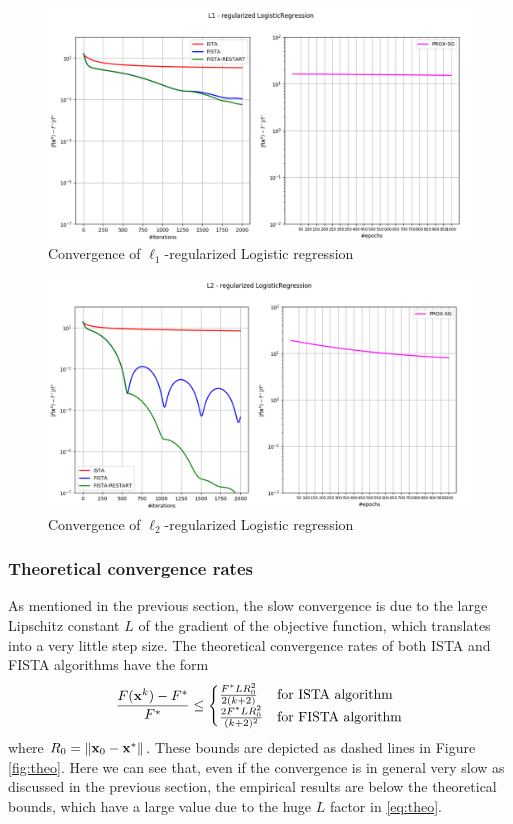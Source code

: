 \documentclass{article}
\begin{document}
\begin{figure}[H]
    \centering
    \includegraphics[trim={2.5cm 0cm 1cm 0},clip, width=.9\textwidth]{img/convergence_l1.png}
    \caption{Convergence of $\ell_1$-regularized Logistic regression}
    \label{fig:conv_l1}
\end{figure}
\begin{figure}[H]
    \centering
    \includegraphics[trim={2.5cm 0cm 1.5cm 0},clip, width=.9\textwidth]{img/convergence_l2.png}
    \caption{Convergence of $\ell_2$-regularized Logistic regression}
    \label{fig:conv_l2}
\end{figure}

\subsubsection*{Theoretical convergence rates}
As mentioned in the previous section, the slow convergence is due to the large Lipschitz constant $L$ of the gradient of the objective function, which translates into a very little step size. The theoretical convergence rates of both ISTA and FISTA algorithms have the form
\begin{align}
    \frac{F(\mathbf{x}^k) - F^*}{F^*} \leq 
    \begin{cases}
        \frac{F^* L R_0^2}{2(k+2)} &\text{for ISTA algorithm} \\
        \frac{2 F^* L R_0^2}{(k+2)^2} &\text{for FISTA algorithm}
    \end{cases}
    \label{eq:theo}
\end{align}
where $R_0 = \left\lVert\mathbf{x}_0 - \mathbf{x}^*\right\rVert$. These bounds are depicted as dashed lines in Figure \ref{fig:theo}. Here we can see that, even if the convergence is in general very slow as discussed in the previous section, the empirical results are below the theoretical bounds, which have a large value due to the huge $L$ factor in \eqref{eq:theo}.
\end{document}
